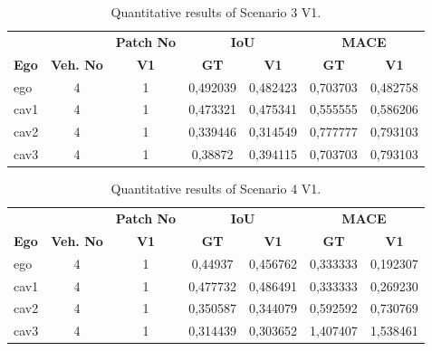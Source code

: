 \begin{table}[H]
    \centering
    \caption{Quantitative results of Scenario 3 V1.}
    \label{tab:scenario3v1_results}
    \begin{tabularx}{\textwidth}{l c c c c c c}
        \toprule
            &             &   \multicolumn{1}{c}{\textbf{Patch No}}  & \multicolumn{2}{c}{\textbf{IoU}} & \multicolumn{2}{c}{\textbf{MACE}}                            \\
        \cmidrule(lr){4-5}\cmidrule(lr){6-7}
        \textbf{Ego}           &
        \textbf{Veh. No}       &
        \textbf{V1}      &
        \textbf{GT}            & \textbf{V1}  &
        \textbf{GT}            & \textbf{V1}  \\
        \midrule
        ego         & 4  & 1 & 0,492039 & 0,482423 & 0,703703 & 0,482758 \\
        cav1        & 4  & 1 & 0,473321 & 0,475341 & 0,555555 & 0,586206 \\
        cav2        & 4  & 1 & 0,339446 & 0,314549 & 0,777777 & 0,793103 \\
        cav3        & 4  & 1 & 0,38872 & 0,394115 & 0,703703 & 0,793103 \\
        \bottomrule
    \end{tabularx}
\end{table}

\begin{table}[H]
    \centering
    \caption{Quantitative results of Scenario 4 V1.}
    \label{tab:scenario4v1_results}
    \begin{tabularx}{\textwidth}{l c c c c c c}
        \toprule
            &             &   \multicolumn{1}{c}{\textbf{Patch No}}  & \multicolumn{2}{c}{\textbf{IoU}} & \multicolumn{2}{c}{\textbf{MACE}}                            \\
        \cmidrule(lr){4-5}\cmidrule(lr){6-7}
        \textbf{Ego}           &
        \textbf{Veh. No}       &
        \textbf{V1}      &
        \textbf{GT}            & \textbf{V1}  &
        \textbf{GT}            & \textbf{V1}  \\
        \midrule
        ego         & 4  & 1 & 0,44937 & 0,456762 & 0,333333 & 0,192307 \\
        cav1        & 4  & 1 & 0,477732 & 0,486491 & 0,333333 & 0,269230 \\
        cav2        & 4  & 1 & 0,350587 & 0,344079 & 0,592592 & 0,730769 \\
        cav3        & 4  & 1 & 0,314439 & 0,303652 & 1,407407 & 1,538461 \\
        \bottomrule
    \end{tabularx}
\end{table}

